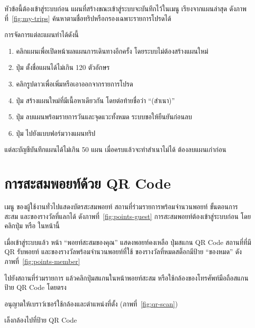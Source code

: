 หัวข้อนี้ต้องเข้าสู่ระบบก่อน แผนที่สร้างขณะเข้าสู่ระบบจะบันทึกไว้ในเมนู  เรียงจากแผนล่าสุด ดังภาพที่~\ref{fig:my-trips} ค้นหาตามชื่อทริปหรือกรองเฉพาะรายการโปรดได้


การจัดการแต่ละแผนทำได้ดังนี้

\begin{enumerate}
\item คลิกแผนเพื่อเปิดหน้าผลแผนการเดินทางอีกครั้ง โดยระบบไม่ต้องสร้างแผนใหม่
\item ปุ่ม  ตั้งชื่อแผนได้ไม่เกิน 120 ตัวอักษร
\item คลิกรูปดาวเพื่อเพิ่มหรือเอาออกจากรายการโปรด
\item ปุ่ม  สร้างแผนใหม่ที่มีเนื้อหาเดียวกัน โดยต่อท้ายชื่อว่า ``(สำเนา)''
\item ปุ่ม  ลบแผนพร้อมรายการวันและจุดแวะทั้งหมด ระบบขอให้ยืนยันก่อนลบ
\item ปุ่ม  ไปยังแบบฟอร์มวางแผนทริป
\end{enumerate}

\begin{important}
แต่ละบัญชีบันทึกแผนได้ไม่เกิน 50 แผน เมื่อครบแล้วจะทำสำเนาไม่ได้ ต้องลบแผนเก่าก่อน
\end{important}

\section{การสะสมพอยท์ด้วย QR Code}
\label{sec:points}

เมนู  ของผู้ใช้งานทั่วไปแสดงบัตรสะสมพอยท์ สถานที่ร่วมรายการพร้อมจำนวนพอยท์ ขั้นตอนการสะสม และของรางวัลที่แลกได้ ดังภาพที่~\ref{fig:points-guest} การสะสมพอยท์ต้องเข้าสู่ระบบก่อน โดยคลิกปุ่ม  หรือ  ในหน้านี้


เมื่อเข้าสู่ระบบแล้ว หน้า ``พอยท์สะสมของคุณ'' แสดงพอยท์คงเหลือ ปุ่มสแกน QR Code สถานที่ที่มี QR รับพอยท์ และของรางวัลพร้อมจำนวนพอยท์ที่ใช้ ของรางวัลที่หมดสต็อกมีป้าย ``ของหมด'' ดังภาพที่~\ref{fig:points-member}


\begin{steps}
  \item ไปยังสถานที่ร่วมรายการ แล้วคลิกปุ่มสแกนในหน้าพอยท์สะสม หรือใช้กล้องของโทรศัพท์มือถือสแกนป้าย QR Code โดยตรง
  \item อนุญาตให้เบราว์เซอร์ใช้กล้องและตำแหน่งที่ตั้ง (ภาพที่~\ref{fig:qr-scan})
  \item เล็งกล้องไปที่ป้าย QR Code
\end{steps}

